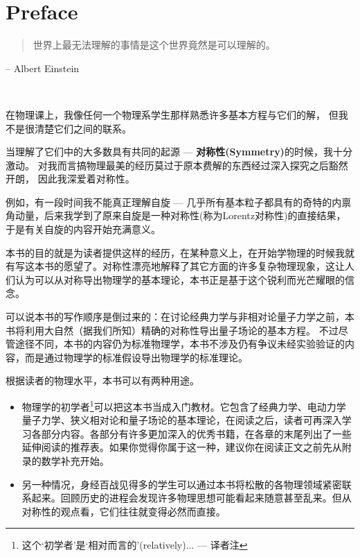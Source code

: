 
\chapter*{Preface}

\begin{quote}
世界上最无法理解的事情是这个世界竟然是可以理解的。
\end{quote}
\begin{flushright}
-- Albert Einstein
\end{flushright}


\ 

在物理课上，我像任何一个物理系学生那样熟悉许多基本方程与它们的解， 但我不是很清楚它们之间的联系。

当理解了它们中的大多数具有共同的起源 --- \textbf{对称性(Symmetry)}的时候，我十分激动。 对我而言搞物理最美的经历莫过于原本费解的东西经过深入探究之后豁然开朗， 因此我深爱着对称性。

例如，有一段时间我不能真正理解自旋 --- 几乎所有基本粒子都具有的奇特的内禀角动量，后来我学到了原来自旋是一种对称性(称为Lorentz对称性)的直接结果，于是有关自旋的内容开始充满意义。

本书的目的就是为读者提供这样的经历，在某种意义上，在开始学物理的时候我就有写这本书的愿望了。对称性漂亮地解释了其它方面的许多复杂物理现象，这让人们认为可以从对称导出物理学的基本理论，本书正是基于这个锐利而光芒耀眼的信念。

可以说本书的写作顺序是倒过来的：在讨论经典力学与非相对论量子力学之前，本书将利用大自然（据我们所知）精确的对称性导出量子场论的基本方程。 不过尽管途径不同，本书的内容仍为标准物理学，本书不涉及仍有争议未经实验验证的内容，而是通过物理学的标准假设导出物理学的标准理论。

根据读者的物理水平，本书可以有两种用途。
\begin{itemize}
	\item 物理学的初学者\footnote{这个`初学者'是`相对而言的'(relatively)... --- 译者注}可以把这本书当成入门教材。它包含了经典力学、电动力学量子力学、狭义相对论和量子场论的基本理论，在阅读之后，读者可再深入学习各部分内容。各部分有许多更加深入的优秀书籍，在各章的末尾列出了一些延伸阅读的推荐表。如果你觉得你属于这一种，建议你在阅读正文之前先从附录的数学补充开始。
	\item 
	另一种情况，身经百战见得多的学生可以通过本书将松散的各物理领域紧密联系起来。回顾历史的进程会发现许多物理思想可能看起来随意甚至乱来。但从对称性的观点看，它们往往就变得必然而直接。
\end{itemize}

